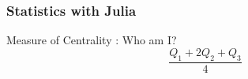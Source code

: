 \documentclass[Master.tex]{subfiles}
\begin{document}
\begin{frame}[fragile]
	\frametitle{Statistics with Julia}	
	\large
\vspace{-1.5cm}
Measure of Centrality :  Who am I?\\ \bigskip
{
	\LARGE
\[ \frac{Q_1 + 2Q_2 + Q_3}{4} \]
}
	
\end{frame}
\end{document}
